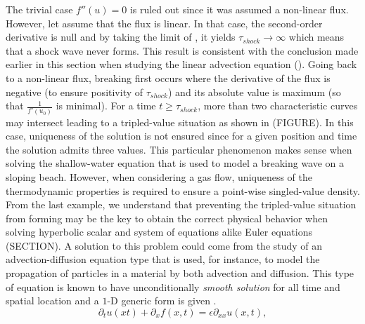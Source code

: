 The trivial case $f''(u) = 0$ is ruled out since it was assumed a non-linear flux. However, let assume that the flux is linear. In that case, the second-order derivative is null and by taking the limit of , it yields $\tau_{shock} \to \infty$ which means that a shock wave never forms. This result is consistent with the conclusion made earlier in this section when studying the linear advection equation (). Going back to a non-linear flux, breaking first occurs where the derivative of the flux is negative (to ensure positivity of $\tau_{shock}$) and its absolute value is maximum (so that $\frac{1}{f'(u_0)}$ is minimal). For a time $t \geq \tau_{shock}$, more than two characteristic curves may intersect leading to a tripled-value situation as shown in (FIGURE). In this case, uniqueness of the solution is not ensured since for a given position and time the solution admits three values. This particular phenomenon makes sense when solving the shallow-water equation that is used to model a breaking wave on a sloping beach. However, when considering a gas flow, uniqueness of the thermodynamic properties is required to ensure a point-wise singled-value density. From the last example, we understand that preventing the tripled-value situation from forming may be the key to obtain the correct physical behavior when solving hyperbolic scalar and system of equations alike Euler equations (SECTION). A solution to this problem could come from the study of an advection-diffusion equation type that is used, for instance, to model the propagation of particles in a material by both advection and diffusion. This type of equation is known to have unconditionally \emph{smooth solution} for all time and spatial location and a $1$-D generic form is given .
%
\begin{equation}\label{eq:adv_diff_sct1b}
\partial_t u(xt) + \partial_x f(x,t) = \epsilon \partial_{xx} u(x,t),
\end{equation}
% 
